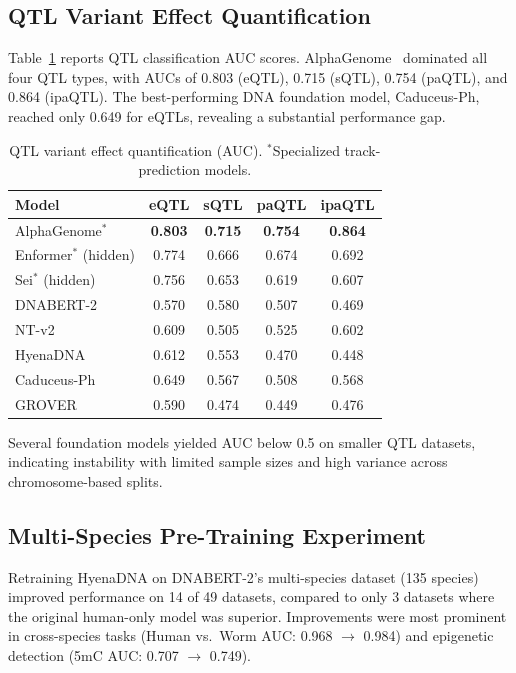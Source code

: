 \documentclass[11pt]{article}
\begin{document}
\subsection{QTL Variant Effect Quantification}

Table~\ref{tab:qtl} reports QTL classification AUC scores.  AlphaGenome~\citep{cheng2025alphagenome} dominated all four QTL types, with AUCs of 0.803 (eQTL), 0.715 (sQTL), 0.754 (paQTL), and 0.864 (ipaQTL).  The best-performing DNA foundation model, Caduceus-Ph, reached only 0.649 for eQTLs, revealing a substantial performance gap.

\begin{table}[ht]
\centering
\caption{QTL variant effect quantification (AUC). $^*$Specialized track-prediction models.}
\label{tab:qtl}
\begin{tabular}{@{}lcccc@{}}
\toprule
Model & eQTL & sQTL & paQTL & ipaQTL \\
\midrule
AlphaGenome$^*$ & \textbf{0.803} & \textbf{0.715} & \textbf{0.754} & \textbf{0.864} \\
Enformer$^*$ (hidden) & 0.774 & 0.666 & 0.674 & 0.692 \\
Sei$^*$ (hidden) & 0.756 & 0.653 & 0.619 & 0.607 \\
DNABERT-2 & 0.570 & 0.580 & 0.507 & 0.469 \\
NT-v2 & 0.609 & 0.505 & 0.525 & 0.602 \\
HyenaDNA & 0.612 & 0.553 & 0.470 & 0.448 \\
Caduceus-Ph & 0.649 & 0.567 & 0.508 & 0.568 \\
GROVER & 0.590 & 0.474 & 0.449 & 0.476 \\
\bottomrule
\end{tabular}
\end{table}

Several foundation models yielded AUC below 0.5 on smaller QTL datasets, indicating instability with limited sample sizes and high variance across chromosome-based splits.

\subsection{Multi-Species Pre-Training Experiment}

Retraining HyenaDNA on DNABERT-2's multi-species dataset (135 species) improved performance on 14 of 49 datasets, compared to only 3 datasets where the original human-only model was superior.  Improvements were most prominent in cross-species tasks (Human vs.\ Worm AUC: 0.968 $\to$ 0.984) and epigenetic detection (5mC AUC: 0.707 $\to$ 0.749).
\end{document}
